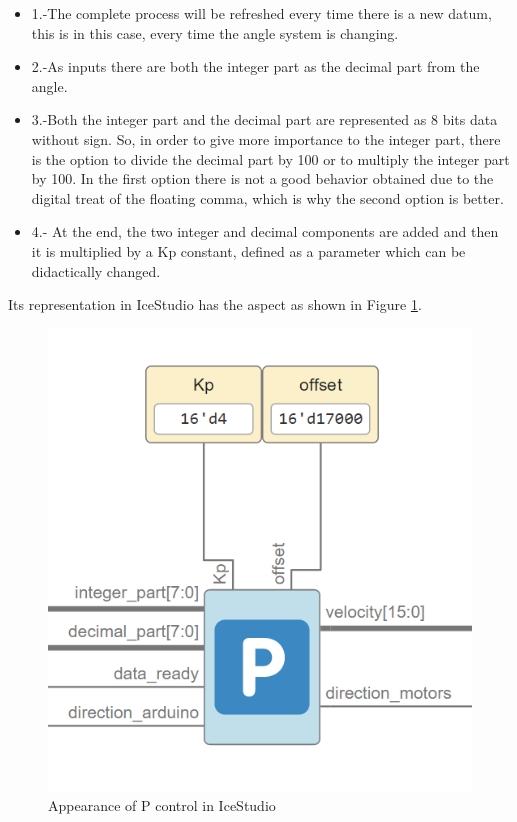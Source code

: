 \begin{itemize}
	\item 1.-The complete process will be refreshed every time there is a new datum, this is in this case, every time the angle system is changing.
	\item 2.-As inputs there are both the integer part as the decimal part from the angle.
	\item 3.-Both the integer part and the decimal part are represented as 8 bits data without sign. So, in order to give more importance to the integer part, there is the option to divide the decimal part by 100 or to multiply the integer part by 100. In the first option there is not a good behavior obtained due to the digital treat of the floating comma, which is why the second option is better.
	\item 4.- At the end, the two integer and decimal components are added and then it is multiplied by a Kp constant, defined as a parameter which can be didactically changed.
\end{itemize}

Its representation in IceStudio has the aspect as shown in Figure \ref{fig:Pcontrol}.

\begin{figure}[H]
	\center
	\includegraphics[scale=0.5]{imagenes/Balancing_robot/Pcontrol}
	\caption{Appearance of P control in IceStudio}
	\label{fig:Pcontrol}
\end{figure}

